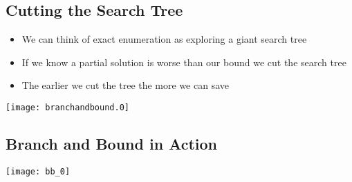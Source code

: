 
\begin{slide}
\section{Cutting the Search Tree}

\begin{PauseHighLight}
\begin{minipage}{15cm}
  \begin{itemize}
  \item We can think of exact enumeration as exploring a giant search
    tree\pause
  \item If we know a partial solution is worse than our bound we cut the
    search tree\pause
  \item The earlier we cut the tree the more we can save\pause
  \end{itemize}
\end{minipage}
\begin{minipage}{8cm}
\texttt{[image: branchandbound.0]}
\end{minipage}
\end{PauseHighLight}

\end{slide}


\begin{slide}
\section{Branch and Bound in Action}

\pb
\pause
\begin{center}
  \texttt{[image: bb\_0]}
\end{center}

\end{slide}



